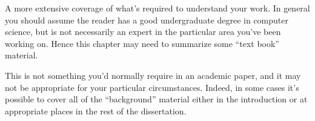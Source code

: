 A more extensive coverage of what's required to understand your 
work. In general you should assume the reader has a good undergraduate 
degree in computer science, but is not necessarily an expert in 
the particular area you've been working on. Hence this chapter 
may need to summarize some ``text book'' material. 

This is not something you'd normally require in an academic paper, 
and it may not be appropriate for your particular circumstances. 
Indeed, in some cases it's possible to cover all of the ``background'' 
material either in the introduction or at appropriate places in 
the rest of the dissertation. 